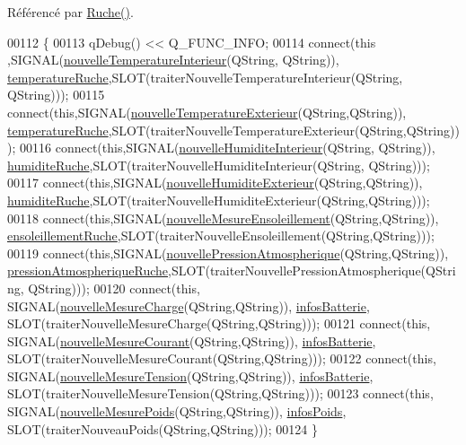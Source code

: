Référencé par \hyperlink{class_ruche_a8b4ee3752d984c5acee93b990db7939a}{Ruche()}.


\begin{DoxyCode}
00112 \{
00113     qDebug() << Q\_FUNC\_INFO;
00114     connect(\textcolor{keyword}{this} ,SIGNAL(\hyperlink{class_ruche_ac4d6e0c0db4b5c992606bff88759b2c3}{nouvelleTemperatureInterieur}(QString, QString)),
      \hyperlink{class_ruche_af721fb92f801a9b1f3ef3aa9867cf3de}{temperatureRuche},SLOT(traiterNouvelleTemperatureInterieur(QString, QString)));
00115     connect(\textcolor{keyword}{this},SIGNAL(\hyperlink{class_ruche_aa8d28f554cd485c32d348a9147d2e236}{nouvelleTemperatureExterieur}(QString,QString)),
      \hyperlink{class_ruche_af721fb92f801a9b1f3ef3aa9867cf3de}{temperatureRuche},SLOT(traiterNouvelleTemperatureExterieur(QString,QString)));
00116     connect(\textcolor{keyword}{this},SIGNAL(\hyperlink{class_ruche_a1d5094246e935d8ae5b9f08c9d042247}{nouvelleHumiditeInterieur}(QString, QString)),
      \hyperlink{class_ruche_acb380928928e693a1933c4cf607ddf80}{humiditeRuche},SLOT(traiterNouvelleHumiditeInterieur(QString, QString)));
00117     connect(\textcolor{keyword}{this},SIGNAL(\hyperlink{class_ruche_af88c6ed0320bfe45d5b15faa936caf4d}{nouvelleHumiditeExterieur}(QString,QString)),
      \hyperlink{class_ruche_acb380928928e693a1933c4cf607ddf80}{humiditeRuche},SLOT(traiterNouvelleHumiditeExterieur(QString,QString)));
00118     connect(\textcolor{keyword}{this},SIGNAL(\hyperlink{class_ruche_aa9eaf4dd1b60e525c7d1bb5319130ce1}{nouvelleMesureEnsoleillement}(QString,QString)),
      \hyperlink{class_ruche_a197003ecff4f029885c7d38569a68d49}{ensoleillementRuche},SLOT(traiterNouvelleEnsoleillement(QString,QString)));
00119     connect(\textcolor{keyword}{this},SIGNAL(\hyperlink{class_ruche_ae72c86953df530bc5d3901ba66cf884d}{nouvellePressionAtmospherique}(QString,QString)),
      \hyperlink{class_ruche_a06efa82900dc7e31ed67c826d3157ae0}{pressionAtmospheriqueRuche},SLOT(traiterNouvellePressionAtmospherique(QString,
      QString)));
00120     connect(\textcolor{keyword}{this}, SIGNAL(\hyperlink{class_ruche_a49ac0c627ecac39c969403db1495711f}{nouvelleMesureCharge}(QString,QString)), 
      \hyperlink{class_ruche_af34340e456aff54c8d1ec433fdbe0740}{infosBatterie}, SLOT(traiterNouvelleMesureCharge(QString,QString)));
00121     connect(\textcolor{keyword}{this}, SIGNAL(\hyperlink{class_ruche_a46d8191444302b02a52d1128c5650730}{nouvelleMesureCourant}(QString,QString)), 
      \hyperlink{class_ruche_af34340e456aff54c8d1ec433fdbe0740}{infosBatterie}, SLOT(traiterNouvelleMesureCourant(QString,QString)));
00122     connect(\textcolor{keyword}{this}, SIGNAL(\hyperlink{class_ruche_aa3fd352b343fcf780787aeb7e42935ef}{nouvelleMesureTension}(QString,QString)), 
      \hyperlink{class_ruche_af34340e456aff54c8d1ec433fdbe0740}{infosBatterie}, SLOT(traiterNouvelleMesureTension(QString,QString)));
00123     connect(\textcolor{keyword}{this}, SIGNAL(\hyperlink{class_ruche_abe5e5d4f4070766d5295d4dc6e0ce03c}{nouvelleMesurePoids}(QString,QString)), 
      \hyperlink{class_ruche_af3d02b62dd3d986b73b38851bb88ec77}{infosPoids}, SLOT(traiterNouveauPoids(QString,QString)));
00124 \}
\end{DoxyCode}
